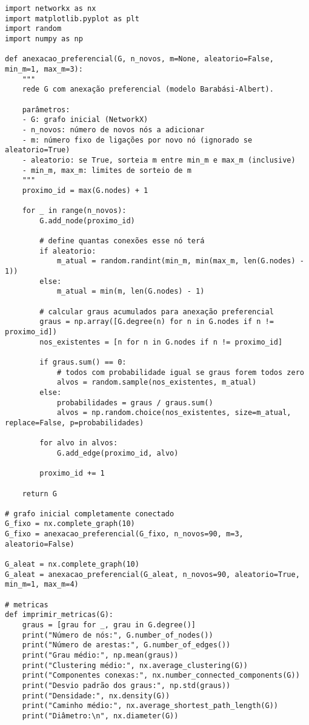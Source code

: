 \documentclass{article}
\begin{document}
\begin{verbatim}
import networkx as nx
import matplotlib.pyplot as plt
import random
import numpy as np

def anexacao_preferencial(G, n_novos, m=None, aleatorio=False, min_m=1, max_m=3):
    """
    rede G com anexação preferencial (modelo Barabási-Albert).

    parâmetros:
    - G: grafo inicial (NetworkX)
    - n_novos: número de novos nós a adicionar
    - m: número fixo de ligações por novo nó (ignorado se aleatorio=True)
    - aleatorio: se True, sorteia m entre min_m e max_m (inclusive)
    - min_m, max_m: limites de sorteio de m
    """
    proximo_id = max(G.nodes) + 1

    for _ in range(n_novos):
        G.add_node(proximo_id)

        # define quantas conexões esse nó terá
        if aleatorio:
            m_atual = random.randint(min_m, min(max_m, len(G.nodes) - 1))
        else:
            m_atual = min(m, len(G.nodes) - 1)

        # calcular graus acumulados para anexação preferencial
        graus = np.array([G.degree(n) for n in G.nodes if n != proximo_id])
        nos_existentes = [n for n in G.nodes if n != proximo_id]

        if graus.sum() == 0:
            # todos com probabilidade igual se graus forem todos zero
            alvos = random.sample(nos_existentes, m_atual)
        else:
            probabilidades = graus / graus.sum()
            alvos = np.random.choice(nos_existentes, size=m_atual, replace=False, p=probabilidades)

        for alvo in alvos:
            G.add_edge(proximo_id, alvo)

        proximo_id += 1

    return G

# grafo inicial completamente conectado
G_fixo = nx.complete_graph(10)
G_fixo = anexacao_preferencial(G_fixo, n_novos=90, m=3, aleatorio=False)

G_aleat = nx.complete_graph(10)
G_aleat = anexacao_preferencial(G_aleat, n_novos=90, aleatorio=True, min_m=1, max_m=4)

# metricas
def imprimir_metricas(G):
    graus = [grau for _, grau in G.degree()]
    print("Número de nós:", G.number_of_nodes())
    print("Número de arestas:", G.number_of_edges())
    print("Grau médio:", np.mean(graus))
    print("Clustering médio:", nx.average_clustering(G))
    print("Componentes conexas:", nx.number_connected_components(G))
    print("Desvio padrão dos graus:", np.std(graus))
    print("Densidade:", nx.density(G))
    print("Caminho médio:", nx.average_shortest_path_length(G))
    print("Diâmetro:\n", nx.diameter(G))



\end{verbatim}
\end{document}
